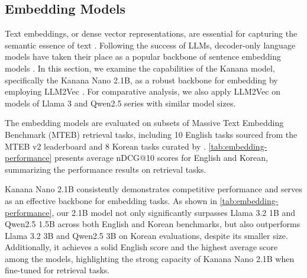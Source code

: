 \subsection{Embedding Models}



Text embeddings, or dense vector representations, are essential for capturing the semantic essence of text \citep{karpukhin2020dense, khattab2020colbert}.
Following the success of LLMs, decoder-only language models have taken their place as a popular backbone of sentence embedding models \citep{muennighoff2022sgpt, wang2023improving, springer2024repetition, ma2024fine, behnamghader2024llm2vec, xu2024bmretriever}.
In this section, we examine the capabilities of the Kanana model, specifically the Kanana Nano 2.1B, as a robust backbone for embedding by employing LLM2Vec \citep{behnamghader2024llm2vec}.
For comparative analysis, we also apply LLM2Vec on models of Llama 3 and Qwen2.5 series with similar model sizes.

\begin{table}[ht]
    \centering
    \caption{Performance comparison of embedding models on English and Korean retrieval benchmarks. All embedding models are fine-tuned from instruct models. See \autoref{appendix:embedding} for detailed evaluations.}
    \label{tab:embedding-performance}
\end{table}

The embedding models are evaluated on subsets of Massive Text Embedding Benchmark (MTEB) \citep{muennighoff2022mteb} retrieval tasks, including 10 English tasks sourced from the MTEB v2 leaderboard \citep{enevoldsen2025mmtebmassivemultilingualtext} and 8 Korean tasks curated by \citet{KURE}.
\autoref{tab:embedding-performance} presents average nDCG@10 scores for English and Korean, summarizing the performance results on retrieval tasks.

Kanana Nano 2.1B consistently demonstrates competitive performance and serves as an effective backbone for embedding tasks.
As shown in \autoref{tab:embedding-performance}, our 2.1B model not only significantly surpasses Llama 3.2 1B and Qwen2.5 1.5B across both English and Korean benchmarks, but also outperforms Llama 3.2 3B and Qwen2.5 3B on Korean evaluations, despite its smaller size.
Additionally, it achieves a solid English score and the highest average score among the models, highlighting the strong capacity of Kanana Nano 2.1B when fine-tuned for retrieval tasks.


